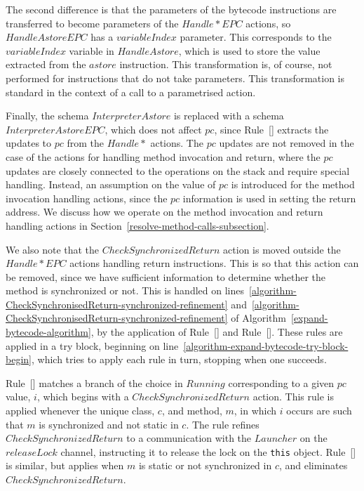 The second difference is that the parameters of the bytecode
instructions are transferred to become parameters of the
$Handle{*}EPC$ actions, so $HandleAstoreEPC$ has a $variableIndex$
parameter.
This corresponds to the $variableIndex$ variable in $HandleAstore$,
which is used to store the value extracted from the $astore$
instruction.
This transformation is, of course, not performed for instructions that
do not take parameters.
This transformation is standard in the context of a call to a
parametrised action.

Finally, the schema $InterpreterAstore$ is replaced with a schema
$InterpreterAstoreEPC$, which does not affect $pc$, since
Rule~[] extracts the
updates to $pc$ from the $Handle{*}$ actions.
The $pc$ updates are not removed in the case of the actions for
handling method invocation and return, where the $pc$ updates are
closely connected to the operations on the stack and require special
handling.
Instead, an assumption on the value of $pc$ is introduced for the
method invocation handling actions, since the $pc$ information is used
in setting the return address.
We discuss how we operate on the method invocation and return handling
actions in Section~\ref{resolve-method-calls-subsection}.

We also note that the $CheckSynchronizedReturn$ action is moved
outside the $Handle{*}EPC$ actions handling return instructions.
This is so that this action can be removed, since we have sufficient
information to determine whether the method is synchronized or not.
This is handled on
lines~\ref{algorithm-CheckSynchronisedReturn-synchronized-refinement}
and~\ref{algorithm-CheckSynchronisedReturn-synchronized-refinement} of
Algorithm~\ref{expand-bytecode-algorithm}, by the application of
Rule~[]
and
Rule~[].
These rules are applied in a try block, beginning on
line~\ref{algorithm-expand-bytecode-try-block-begin}, which tries to
apply each rule in turn, stopping when one succeeds.

Rule~[]
matches a branch of the choice in $Running$ corresponding to a given
$pc$ value, $i$, which begins with a $CheckSynchronizedReturn$ action.
This rule is applied whenever the unique class, $c$, and method, $m$,
in which $i$ occurs are such that $m$ is synchronized and not static
in $c$.
The rule refines $CheckSynchronizedReturn$ to a communication with the
$Launcher$ on the $releaseLock$ channel, instructing it to release the
lock on the \texttt{this} object.
Rule~[]
is similar, but applies when $m$ is static or not synchronized in $c$,
and eliminates $CheckSynchronizedReturn$.

